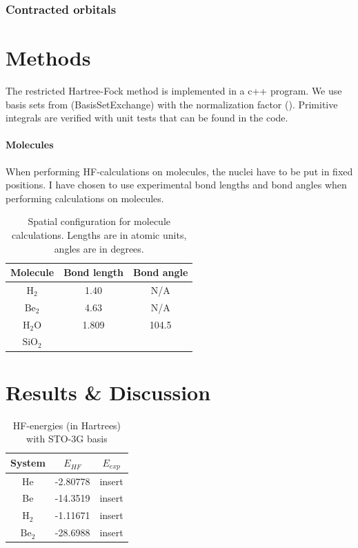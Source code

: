 \documentclass[a4paper,10pt, twocolumn, pre]{revtex4}
\begin{document}
\section{Contracted orbitals}

\part{Methods}
The restricted Hartree-Fock method is implemented in a c++ program. We use basis sets from (BasisSetExchange) with the normalization factor (). 
Primitive integrals are verified with unit tests that can be found in the code.

\subsection{Molecules}
When performing HF-calculations on molecules, the nuclei have to be put in fixed positions. I have chosen to use experimental bond lengths and bond angles when performing calculations on molecules.

\begin{table}
\caption{Spatial configuration for molecule calculations. Lengths are in atomic units, angles are in degrees.}
\begin{tabular}[c]{c|c|c}
Molecule & Bond length & Bond angle \\
\hline
$\mbox{H}_2$ & 1.40 & N/A \\
$\mbox{Be}_2$ & 4.63 & N/A \\
$\mbox{H}_2\mbox{O}$ & 1.809 & 104.5 \\
$\mbox{SiO}_2$ & 
\end{tabular}
\end{table}  

\part{Results \& Discussion}

\begin{table}[h!tb]
\caption{HF-energies (in Hartrees) with STO-3G basis}
\begin{tabular}[c]{c|c|c}
System & $E_{HF}$ & $E_{exp}$ \\
\hline
He & -2.80778 & insert \\
Be & -14.3519 & insert \\
$\mbox{H}_2$ & -1.11671 & insert \\
$\mbox{Be}_2$ & -28.6988 & insert \\
\end{tabular}
\end{table}
\end{document}
